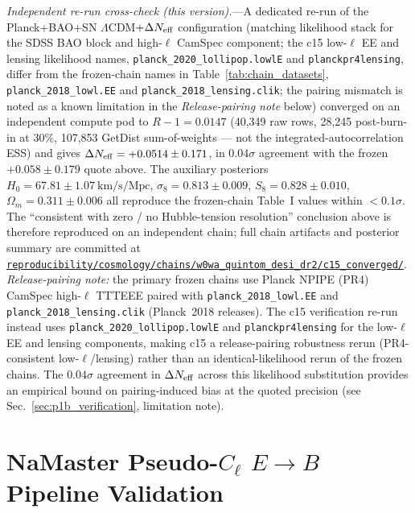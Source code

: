 \documentclass[aps,prd,twocolumn,superscriptaddress,showpacs,preprintnumbers,nofootinbib,longbibliography,floatfix]{revtex4-2}
\newcommand{\Neff}{N_{\rm eff}}
\newcommand{\repoBase}{https://github.com/Hubify-Projects/bigbounce/blob/main}
\providecommand{\artifact}[1]{\href{\repoBase/#1}{\nolinkurl{#1}}}
\begin{document}
\textit{Independent re-run cross-check (this version).}---A dedicated
re-run of the Planck+BAO+SN $\Lambda$CDM$+\Delta\Neff$ configuration
(matching likelihood stack for the SDSS BAO block and high-$\ell$ CamSpec component; the c15 low-$\ell$ EE and lensing likelihood names, \texttt{planck\_2020\_lollipop.lowlE} and \texttt{planckpr4lensing}, differ from the frozen-chain names in Table~\ref{tab:chain_datasets}, \texttt{planck\_2018\_lowl.EE} and \texttt{planck\_2018\_lensing.clik}; the pairing mismatch is noted as a known limitation in the \emph{Release-pairing note} below) converged on an
independent compute pod to $R\!-\!1\!=\!0.0147$
(40,349 raw rows, 28,245 post-burn-in at 30\%, 107,853 GetDist sum-of-weights --- not the integrated-autocorrelation ESS)
and gives $\Delta N_{\rm eff} = +0.0514 \pm 0.171$, in $0.04\sigma$
agreement with the frozen $+0.058 \pm 0.179$ quote above. The auxiliary
posteriors $H_0 = 67.81 \pm 1.07~\mathrm{km/s/Mpc}$,
$\sigma_8 = 0.813 \pm 0.009$, $S_8 = 0.828 \pm 0.010$,
$\Omega_m = 0.311 \pm 0.006$ all reproduce the frozen-chain Table~I
values within $<\!0.1\sigma$. The ``consistent with zero / no
Hubble-tension resolution'' conclusion above is therefore reproduced
on an independent chain; full chain artifacts and posterior summary
are committed at \artifact{reproducibility/cosmology/chains/w0wa_quintom_desi_dr2/c15_converged/}.
\emph{Release-pairing note:} the primary frozen chains use Planck NPIPE (PR4) CamSpec high-$\ell$ TTTEEE
paired with \texttt{planck\_2018\_lowl.EE} and \texttt{planck\_2018\_lensing.clik} (Planck~2018 releases).
The c15 verification re-run instead uses \texttt{planck\_2020\_lollipop.lowlE} and
\texttt{planckpr4lensing} for the low-$\ell$ EE and lensing components, making c15 a
release-pairing robustness rerun (PR4-consistent low-$\ell$/lensing) rather than an
identical-likelihood rerun of the frozen chains. The $0.04\sigma$ agreement in $\Delta\Neff$
across this likelihood substitution provides an empirical bound on pairing-induced bias
at the quoted precision (see Sec.~\ref{sec:p1b_verification}, limitation note).



\section{NaMaster Pseudo-$C_\ell$ $E\!\to\!B$ Pipeline Validation}\label{app:namaster}
\end{document}
